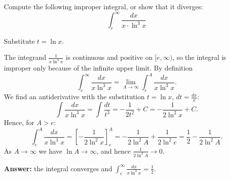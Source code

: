 
\begin{question}
Compute the following improper integral, or show that it diverges:
\[ \int_e^\infty \frac{dx}{x \cdot \ln^3 x} \]
\end{question}

\begin{hint}
Substitute $t = \ln x$.
\end{hint}

\begin{solution}
The integrand $\frac{1}{x\ln^3 x}$ is continuous and positive on $[e, \infty)$, so the integral is improper only because of the infinite upper limit. By definition
\[ \int_e^\infty \frac{dx}{x\ln^3 x} = \lim_{A\to\infty} \int_e^A \frac{dx}{x\ln^3 x}. \]
We find an antiderivative with the substitution $t = \ln x$, $dt = \frac{dx}{x}$:
\[ \int \frac{dx}{x\ln^3 x} = \int \frac{dt}{t^3} = -\frac{1}{2t^2} + C = -\frac{1}{2\ln^2 x} + C. \]
Hence, for $A > e$:
\[ \int_e^A \frac{dx}{x\ln^3 x} = \left[ -\frac{1}{2\ln^2 x} \right]_e^A = -\frac{1}{2\ln^2 A} + \frac{1}{2\ln^2 e} = \frac12 - \frac{1}{2\ln^2 A}. \]
As $A \to \infty$ we have $\ln A \to \infty$, and hence $\frac{1}{2\ln^2 A} \to 0$.

\textbf{Answer:} the integral converges and $\boxed{\int_e^\infty \frac{dx}{x\ln^3 x} = \frac12}$.
\end{solution}
